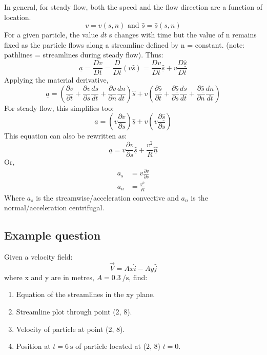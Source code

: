 In general, for steady flow, both the speed and the flow direction are a function of location.
\begin{equation}
  v = v(s, n) \textrm{ and } \underline{\hat{s}} = \underline{\hat{s}}(s, n)
\end{equation}
For a given particle, the value \(dt \) s changes with time but the value of n remains fixed as the particle flows along a streamline defined by n = constant. (note: pathlines = streamlines during steady flow). Thus:
\begin{equation}
  \underline{a} = \frac{Dv}{Dt} = \frac{D}{Dt}(v\hat{s}) = \frac{Dv}{Dt}\underline{\hat{s}} + v \frac{D\underline{\hat{s}}}{Dt}
\end{equation}
Applying the material derivative,
\begin{equation}
  \underline{a} = \left( \frac{\partial v}{\partial t} + \frac{\partial v}{\partial s}\frac{ds}{dt} + \frac{\partial v}{\partial n}\frac{dn}{dt} \right) \hat{s} + v \left( \frac{\partial \underline{\hat{s}}}{\partial t} + \frac{\partial \underline{\hat{s}}}{\partial s}\frac{ds}{dt} + \frac{\partial \underline{\hat{s}}}{\partial n}\frac{dn}{dt} \right)
\end{equation}
For steady flow, this simplifies too:
\begin{equation}
  \underline{a} = \left( v\frac{\partial v}{\partial s} \right) \underline{\hat{s}} + v \left( v\frac{\partial \underline{\hat{s}}}{\partial s} \right)
\end{equation}
This equation can also be rewritten as:
\begin{equation}
  \underline{a} = v\frac{\partial v}{\partial s} \underline{\hat{s}} + \frac{v^2}{R} \underline{\hat{n}}
\end{equation}
Or,
\begin{align}
  a_s & = v\frac{\partial v}{\partial s} \\
  a_n & = \frac{v^2}{R}
\end{align}
Where \(a_s\) is the streamwise/acceleration convective and \(a_n\) is the normal/acceleration centrifugal.
\subsection{Example question}
Given a velocity field:
\begin{equation}
  \vec{V} = Ax\hat{i} - Ay\hat{j}
\end{equation}
where x and y are in metres, $A = 0.3 \ \si{\per\second}$, find:
\begin{enumerate}[noitemsep]
  \item Equation of the streamlines in the xy plane.
  \item Streamline plot through point (2, 8).
  \item Velocity of particle at point (2, 8).
  \item Position at $t = 6 \ \si{\second}$ of particle located at (2, 8) $t =0$.
\end{enumerate}
